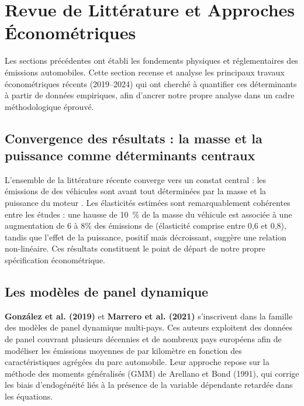 \documentclass[12pt, a4paper]{article}
\begin{document}
\section{Revue de Littérature et Approches Économétriques}

Les sections précédentes ont établi les fondements physiques et réglementaires des émissions automobiles. Cette section recense et analyse les principaux travaux économétriques récents (2019--2024) qui ont cherché à quantifier ces déterminants à partir de données empiriques, afin d'ancrer notre propre analyse dans un cadre méthodologique éprouvé.

\subsection{Convergence des résultats : la masse et la puissance comme déterminants centraux}

L'ensemble de la littérature récente converge vers un constat central : les émissions de  des véhicules sont avant tout déterminées par la masse et la puissance du moteur \cite{gonzalez2019, marrero2021, chatzipanagi2022}. Les élasticités estimées sont remarquablement cohérentes entre les études : une hausse de \SI{10}{\percent} de la masse du véhicule est associée à une augmentation de 6 à 8\% des émissions de  (élasticité comprise entre 0,6 et 0,8), tandis que l'effet de la puissance, positif mais décroissant, suggère une relation non-linéaire. Ces résultats constituent le point de départ de notre propre spécification économétrique.

\subsection{Les modèles de panel dynamique}

\textbf{González et al. (2019)} et \textbf{Marrero et al. (2021)} s'inscrivent dans la famille des modèles de panel dynamique multi-pays. Ces auteurs exploitent des données de panel couvrant plusieurs décennies et de nombreux pays européens afin de modéliser les émissions moyennes de  par kilomètre en fonction des caractéristiques agrégées du parc automobile. Leur approche repose sur la méthode des moments généralisés (GMM) de Arellano et Bond (1991), qui corrige les biais d'endogénéité liés à la présence de la variable dépendante retardée dans les équations.
\end{document}
